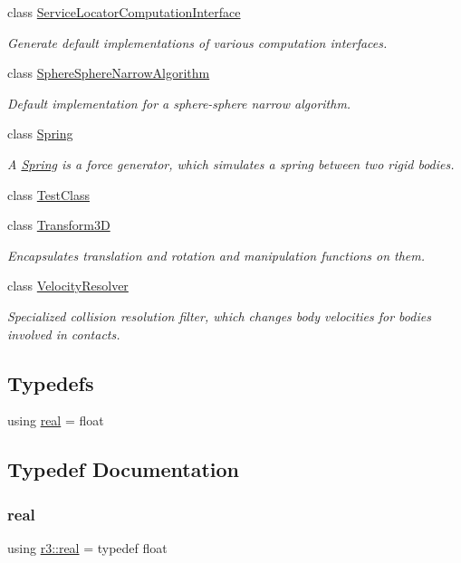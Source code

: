 \begin{DoxyCompactItemize}
class \mbox{\hyperlink{classr3_1_1_service_locator_computation_interface}{Service\+Locator\+Computation\+Interface}}
\begin{DoxyCompactList}\small\item\em Generate default implementations of various computation interfaces. \end{DoxyCompactList}\item 
class \mbox{\hyperlink{classr3_1_1_sphere_sphere_narrow_algorithm}{Sphere\+Sphere\+Narrow\+Algorithm}}
\begin{DoxyCompactList}\small\item\em Default implementation for a sphere-\/sphere narrow algorithm. \end{DoxyCompactList}\item 
class \mbox{\hyperlink{classr3_1_1_spring}{Spring}}
\begin{DoxyCompactList}\small\item\em A \mbox{\hyperlink{classr3_1_1_spring}{Spring}} is a force generator, which simulates a spring between two rigid bodies. \end{DoxyCompactList}\item 
class \mbox{\hyperlink{classr3_1_1_test_class}{Test\+Class}}
\item 
class \mbox{\hyperlink{classr3_1_1_transform3_d}{Transform3D}}
\begin{DoxyCompactList}\small\item\em Encapsulates translation and rotation and manipulation functions on them. \end{DoxyCompactList}\item 
class \mbox{\hyperlink{classr3_1_1_velocity_resolver}{Velocity\+Resolver}}
\begin{DoxyCompactList}\small\item\em Specialized collision resolution filter, which changes body velocities for bodies involved in contacts. \end{DoxyCompactList}\end{DoxyCompactItemize}
\subsection*{Typedefs}
\begin{DoxyCompactItemize}
\item 
using \mbox{\hyperlink{namespacer3_ab2016b3e3f743fb735afce242f0dc1eb}{real}} = float
\end{DoxyCompactItemize}


\subsection{Typedef Documentation}
\mbox{\label{namespacer3_ab2016b3e3f743fb735afce242f0dc1eb}} 
\subsubsection{\texorpdfstring{real}{real}}
{\footnotesize\ttfamily using \mbox{\hyperlink{namespacer3_ab2016b3e3f743fb735afce242f0dc1eb}{r3\+::real}} = typedef float}

